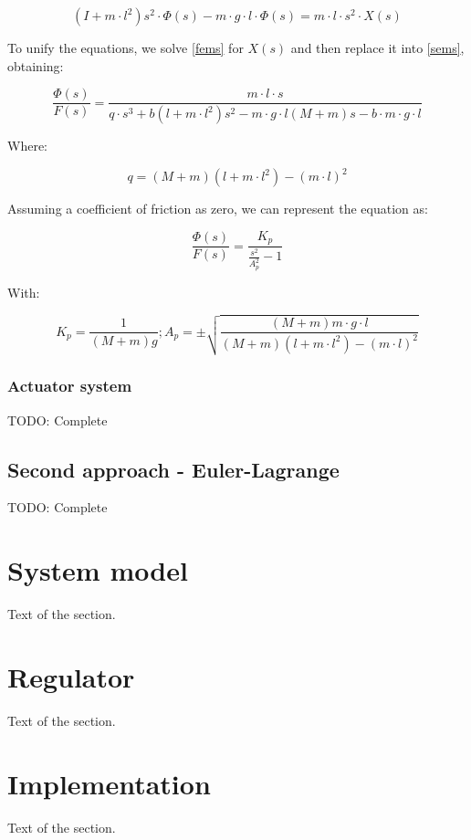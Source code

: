 \documentclass{article}
\begin{document}
\begin{equation} \label{sems}
(I+m\cdot l^2)s^2\cdot \Phi(s)-m\cdot g\cdot l\cdot \Phi(s)=m\cdot l\cdot s^2\cdot X(s)
\end{equation}

To unify the equations, we solve \ref{fems} for $X(s)$ and then replace it into \ref{sems}, obtaining:

\begin{equation} \label{ecms}
\frac{\Phi(s)}{F(s)}=\frac{m\cdot l\cdot s}{q\cdot s^3+b(l+m\cdot l^2)s^2-m\cdot g\cdot l(M+m)s-b\cdot m\cdot g\cdot l}
\end{equation}

Where:

\begin{equation} \label{dq}
q=(M+m)(l+m\cdot l^2)-(m\cdot l)^2
\end{equation}

Assuming a coefficient of friction as zero, we can represent the equation as:

\begin{equation} \label{efms}
\frac{\Phi(s)}{F(s)}=\frac{K_p}{\frac{s^2}{A_p^2}-1}
\end{equation}

With:

\begin{equation} \label{dka}
K_p=\frac{1}{(M+m)g} ; A_p=\pm \sqrt{\frac{(M+m)m\cdot g\cdot l}{(M+m)(l+m\cdot l^2)-(m\cdot l)^2}}
\end{equation}

\subsubsection{Actuator system}

TODO: Complete

\subsection{Second approach - Euler-Lagrange}

TODO: Complete

\section{System model}

Text of the section.

\section{Regulator}

Text of the section.

\section{Implementation}

Text of the section.

\begin{appendix}
	\newpage
	\listoffigures
	\newpage
	\listoftables
\end{appendix}

\newpage
\printbibliography
\nocite{*}
\end{document}
